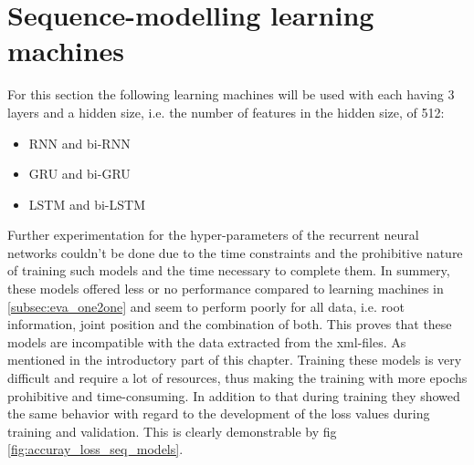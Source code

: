 	\section{Sequence-modelling learning machines}\label{subsec:eve_seq} 
		For this section the following learning machines will be used with each having 3 layers and a hidden size, i.e. the number of features in the hidden size, of 512:
		\begin{itemize}
			\item RNN and bi-RNN
			\item GRU and bi-GRU
			\item LSTM and bi-LSTM
		\end{itemize}
		Further experimentation for the hyper-parameters of the recurrent neural networks couldn't be done due to the time constraints and the prohibitive nature of training such models and the time necessary to complete them. In summery, these models offered less or no performance compared to learning machines in \ref{subsec:eva_one2one} and seem to perform poorly for all data, i.e. root information, joint position and the combination of both. This proves that these models are incompatible with the data extracted from the xml-files. As mentioned in the introductory part of this chapter. Training these models is very difficult and require a lot of resources, thus making the training with more epochs prohibitive and time-consuming. In addition to that during training they showed the same behavior with regard to the development of the loss values during training and validation. This is clearly demonstrable by fig \ref{fig:accuray_loss_seq_models}.
